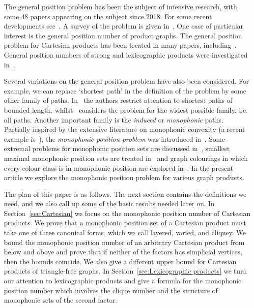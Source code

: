\documentclass[12pt]{article}
\begin{document}
The general position problem has been the subject of intensive research, with some 48 papers appearing on the subject since 2018. For some recent developments see~\cite{Araujo-2025, KlaSam, DiKlKrTu-2025, irsic-2024, KlaKriTuiYer-2023, Roy-2025, ChaDiSreeThoTui2024+, Thomas-2024a, powers, TianXuChao-2023, yao-2022}. A survey of the problem is given in~\cite{survey}. One case of particular interest is the general position number of product graphs. The general position problem for Cartesian products has been treated in many papers, including~\cite{KlaPatRusYero-2021, KlavzarRus-2021, KorzeVesel-2023, Kruft-2024, Tian-2021a, Tian-2021b}. General position numbers of strong and lexicographic products were investigated in~\cite{Dokyeesun-2024b}.

Several variations on the general position problem have also been considered. For example, we can replace `shortest path' in the definition of the problem by some other family of paths. In~\cite{KlaRalYer-2021} the authors restrict attention to shortest paths of bounded length, whilst~\cite{Haponenko-2024} considers the problem for the widest possible family, i.e. all paths. Another important family is the \emph{induced} or \emph{monophonic} paths. Partially inspired by the extensive literature on monophonic convexity (a recent example is~\cite{neethu-2024}), the \emph{monophonic position problem} was introduced in~\cite{Thomas-2024b}. Some extremal problems for monophonic position sets are discussed in~\cite{TuiThoCha-2023+}, smallest maximal monophonic position sets are treated in~\cite{DiKlKrTu-2025} and graph colourings in which every colour class is in monophonic position are explored in~\cite{ChaDiSreeThoTui2024+}. In the present article we explore the monophonic position problem for various graph products.

The plan of this paper is as follows. The next section contains the definitions we need, and we also call up some of the basic results needed later on. In Section~\ref{sec:Cartesian} we focus on the monophonic position number of Cartesian products. We prove that a monophonic position set of a Cartesian product must take one of three canonical forms, which we call layered, varied, and cliquey. We bound the monophonic position number of an arbitrary Cartesian product from below and above and prove that if neither of the factors has simplicial vertices, then the bounds coincide. We also give a different upper bound for Cartesian products of triangle-free graphs. In Section~\ref{sec:Lexicographic products} we turn our attention to lexicographic products and give a formula for the monophonic position number which involves the clique number and the structure of monophonic sets of the second factor.
\end{document}
